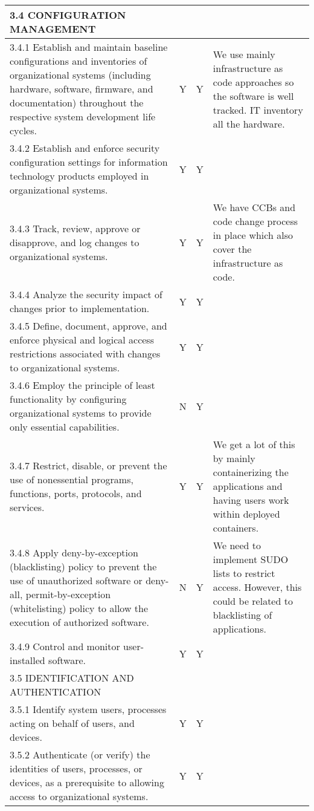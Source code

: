 \begin{longtable} {|p{}|p{}|p{}|p{} |}
{3.4 CONFIGURATION MANAGEMENT}&&& \\ \hline
{3.4.1 Establish and maintain baseline configurations and inventories of organizational systems (including hardware, software, firmware, and documentation) throughout the respective system development life cycles.}&{Y}&{Y}&{We use mainly infrastructure as code approaches so the software is well tracked. IT inventory all the hardware. } \\ \hline
{3.4.2 Establish and enforce security configuration settings for information technology products employed in organizational systems.}&{Y}&{Y}& \\ \hline
{3.4.3 Track, review, approve or disapprove, and log changes to organizational systems.}&{Y}&{Y}&{We have CCBs and code change process in place which also cover the infrastructure as code. } \\ \hline
{3.4.4 Analyze the security impact of changes prior to implementation.}&{Y}&{Y}& \\ \hline
{3.4.5 Define, document, approve, and enforce physical and logical access restrictions associated with changes to organizational systems.}&{Y}&{Y}& \\ \hline
{3.4.6 Employ the principle of least functionality by configuring organizational systems to provide only essential capabilities.}&{N}&{Y}& \\ \hline
{3.4.7 Restrict, disable, or prevent the use of nonessential programs, functions, ports, protocols, and services.}&{Y}&{Y}&{We get a lot of this by mainly containerizing the applications and having users work within deployed containers.} \\ \hline
{3.4.8 Apply deny-by-exception (blacklisting) policy to prevent the use of unauthorized software or deny-all, permit-by-exception (whitelisting) policy to allow the execution of authorized software.}&{N}&{Y}&{We need to implement SUDO lists to restrict access. However, this could be related to blacklisting of applications.} \\ \hline
{3.4.9 Control and monitor user-installed software.}&{Y}&{Y}& \\ \hline
{3.5 IDENTIFICATION AND AUTHENTICATION}&&& \\ \hline
{3.5.1 Identify system users, processes acting on behalf of users, and devices.}&{Y}&{Y}& \\ \hline
{3.5.2 Authenticate (or verify) the identities of users, processes, or devices, as a prerequisite to allowing access to organizational systems.}&{Y}&{Y}& \\ \hline

\end{longtable}
